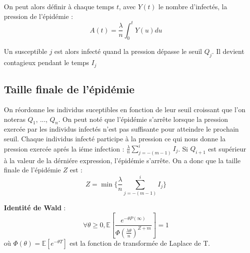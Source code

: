 On peut alors définir à chaque temps $t$, avec $Y(t)$ le nombre d'infectés, la pression de l'épidémie :
$$ A(t) = \frac{\lambda}{n} \int^t_0 Y(u)du $$

Un susceptible $j$ est alors infecté quand la pression dépasse le seuil $Q_j$. Il devient contagieux pendant le temps $I_j$

\subsection{Taille finale de l'épidémie}

On réordonne les individus suceptibles en fonction de leur seuil croissant que l'on noteras $Q_1$, ..., $Q_n$. On peut noté que l'épidémie s'arrête lorsque la pression exercée par les individus infectés n'est pas suffisante pour atteindre le prochain seuil. Chaque individus infecté participe à la pression ce qui nous donne la pression exercée aprés la iéme infection : $ \frac{\lambda}{n} \sum^i_{j = - (m-1)} I_j $. Si $Q_{i+1}$ est supérieur à la valeur de la dérniére expression, l'épidémie s'arrête. On a donc que la taille finale de l'épidémie $Z$ est :
$$ Z = \min \{\frac{\lambda}{n} \sum^i_{j = - (m-1)} I_j \} $$

\textbf{Identité de Wald} :
$$ \forall \theta \geq 0, \mathbb{E}[ \frac{ e^{-\theta P(\infty)} }{ \Phi( \frac{\lambda \theta}{n})^{Z + m} } ] = 1 $$
où $ \Phi(\theta) = \mathbb{E}[e^{-\theta T}] $ est la fonction de transformée de Laplace de T.
